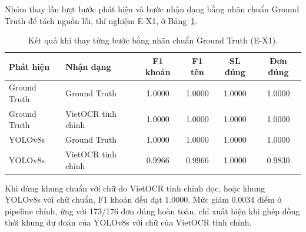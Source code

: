 Nhóm thay lần lượt bước phát hiện và bước nhận dạng bằng nhãn chuẩn Ground Truth để tách nguồn lỗi, thí nghiệm E-X1, ở Bảng~\ref{tab:EX1}.

\begin{table}[H]
\centering
\caption{Kết quả khi thay từng bước bằng nhãn chuẩn Ground Truth (E-X1).}\label{tab:EX1}
\footnotesize
\begin{tabular}{llcccc}
\toprule
\textbf{Phát hiện} & \textbf{Nhận dạng} & \textbf{F1 khoản} & \textbf{F1 tên} & \textbf{SL đúng} & \textbf{Đơn đúng} \\
\midrule
Ground Truth & Ground Truth & \num{1.0000} & \num{1.0000} & \num{1.0000} & \num{1.0000} \\
Ground Truth & VietOCR tinh chỉnh & \num{1.0000} & \num{1.0000} & \num{1.0000} & \num{1.0000} \\
YOLOv8s & Ground Truth & \num{1.0000} & \num{1.0000} & \num{1.0000} & \num{1.0000} \\
YOLOv8s & VietOCR tinh chỉnh & \num{0.9966} & \num{0.9966} & \num{1.0000} & \num{0.9830} \\
\bottomrule
\end{tabular}
\end{table}

Khi dùng khung chuẩn với chữ do VietOCR tinh chỉnh đọc, hoặc khung YOLOv8s với chữ chuẩn, F1 khoản đều đạt \num{1.0000}.
Mức giảm \num{0.0034} điểm ở pipeline chính, ứng với 173/176 đơn đúng hoàn toàn, chỉ xuất hiện khi ghép đồng thời khung dự đoán của YOLOv8s với chữ của VietOCR tinh chỉnh.
